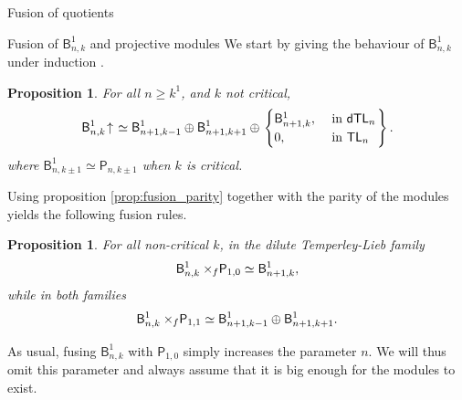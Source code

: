 \documentclass[reqno]{amsart}
\newtheorem{Prop}[Thm]{Proposition}
\newcommand{\dtl}[1]{\mathsf{dTL}_{#1}}
\newcommand{\tl}[1]{\mathsf{TL}_{#1}}
\newcommand{\dP}[1]{\mathsf P_{#1}}
\newcommand{\xf}{\times\hspace{-0.27em}_f}
\newcommand{\B}[2]{\mathsf{B}^{#1}_{#2}}
\newcommand{\Ind}[1]{#1{}\hspace{-0.18em} \uparrow{}\hskip -0.18em}
\begin{document}
\begin{section}{Fusion of quotients}
\begin{subsection}{Fusion of $\B{1}{n,k}$ and projective modules}
We start by giving the behaviour of $\B{1}{n,k}$ under induction \cite{BelRiSy}.
\begin{Prop}
For all $n \geq k^{1}$, and $k$ not critical,
\begin{equation}
\Ind{\B{1}{n,k}} \simeq \B{1}{n+1,k-1}  \oplus \B{1}{n+1,k+1} \oplus \left. \begin{cases}
\B{1}{n+1,k}, & \text{ in } \dtl{n}\\
0, & \text{ in } \tl{n}
\end{cases}\right\}.
\end{equation}
where $\B{1}{n,k \pm 1} \simeq \dP{n,k \pm 1}$ when $k$ is critical.
\end{Prop}
Using proposition \ref{prop:fusion_parity} together with the parity of the modules yields the following fusion rules.
\begin{Prop}
For all non-critical $k$, in the dilute Temperley-Lieb family
\begin{equation}
\B{1}{n,k}\xf\dP{1,0} \simeq \B{1}{n+1,k},
\end{equation}
while in both families
\begin{equation}
\B{1}{n,k} \xf \dP{1,1} \simeq \B{1}{n+1,k-1} \oplus \B{1}{n+1,k+1}.
\end{equation}
\end{Prop}
As usual, fusing $\B{1}{n,k}$ with $\dP{1,0}$ simply increases the parameter $n$. We will thus omit this parameter and always assume that it is big enough for the modules to exist.


\end{subsection}
\end{section}
\end{document}

